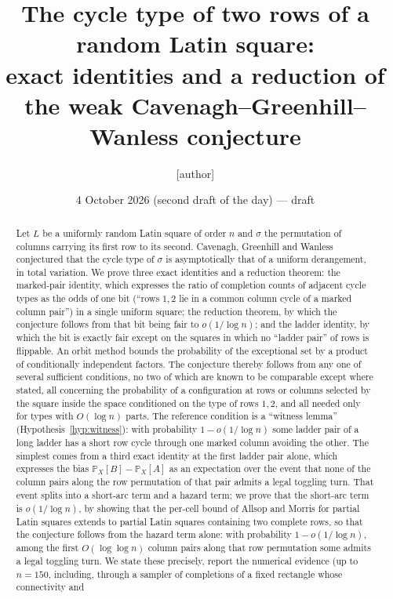 \documentclass[11pt]{article}
\title{The cycle type of two rows of a random Latin square:\\ exact identities and a reduction of the weak Cavenagh--Greenhill--Wanless conjecture}
\author{[author]}
\date{4 October 2026 (second draft of the day) --- draft}
\theoremstyle{definition}
\renewcommand{\Pr}{\mathbb{P}}
\begin{document}
\maketitle

\begin{abstract}
Let $L$ be a uniformly random Latin square of order $n$ and $\sigma$ the permutation of columns
carrying its first row to its second.  Cavenagh, Greenhill and Wanless conjectured that the
cycle type of $\sigma$ is asymptotically that of a uniform derangement, in total variation.
We prove three exact identities and a reduction theorem: the marked-pair identity, which
expresses the ratio of completion counts of adjacent cycle types as the odds of one bit
(``rows $1,2$ lie in a common column cycle of a marked column pair'') in a single uniform
square; the reduction theorem, by which the conjecture follows from that bit being fair to
$o(1/\log n)$; and the ladder identity, by which the bit is exactly fair except on the
squares in which no ``ladder pair'' of rows is flippable.  An orbit method bounds the probability of
the exceptional set by a product of conditionally independent factors.  The
conjecture thereby follows from any one of several sufficient conditions, no two of
which are known to be comparable except where stated, all concerning the probability of a configuration at rows or
columns selected by the square inside the space conditioned on the type of rows $1,2$, and
all needed only for types with $O(\log n)$ parts.  The reference condition is a ``witness
lemma'' (Hypothesis~\ref{hyp:witness}): with probability $1-o(1/\log n)$ some ladder pair
of a long ladder has a short row cycle through one marked column avoiding the other.  The
simplest comes from a third exact identity at the first ladder pair alone, which expresses
the bias $\Pr_X[B]-\Pr_X[A]$ as an expectation over the event that none of the column
pairs along the row permutation of that pair admits a legal toggling turn.  That event
splits into a short-arc term and a hazard term; we prove that the short-arc term is
$o(1/\log n)$, by showing that the per-cell bound of Allsop and Morris for partial Latin
squares extends to partial Latin squares containing two complete rows, so that the
conjecture follows from the hazard term alone: with probability $1-o(1/\log n)$, among the
first $O(\log\log n)$ column pairs along that row permutation some admits a legal
toggling turn.  We state these precisely, report the numerical evidence (up to $n=150$,
including, through a sampler of completions of a fixed rectangle whose connectivity and

\end{abstract}
\end{document}
